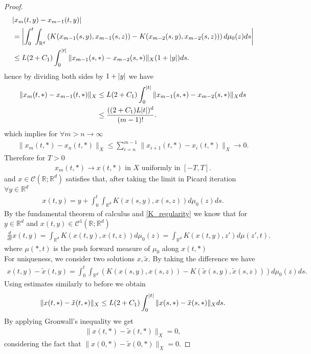 \begin{proof}
  \begin{align*}
    &\abs{x_m(t,y) - x_{m-1}(t,y)} \\
    &= \abs*{\int_0^{t} \int_{\mathbb{R}^{d} }\left( K(x_{m-1}(s,y),x_{m-1}(s,z)) - K(x_{m-2}(s,y),x_{m-2}(s,z)) \right)d\mu_0(z)ds  }\\
    &\le L(2+C_{1})\int_0^{\abs{t}} \|x_{m-1}(s,*)-x_{m-2}(s,*)\|_X(1+\abs{y}) ds
  .\end{align*}
  hence by dividing both sides by $1 + \abs{y}$ we have 
  \begin{align*}
    \|x_m(t,*) - x_{m-1}(t,*)\|_X &\le L(2+C_{1})\int_0^{\abs{t}}  \|x_{m-1}(s,*) - x_{m-2}(s,*)\|_X ds\\
                                  &\le \frac{((2+C_{1})L \abs{t})^{d} }{(m-1)!}
  .\end{align*}
  which implies for $\forall m > n \to \infty$ 
  \begin{align*}
    \|x_m(t,*) - x_n(t,*)\|_X \le  \sum_{i=n}^{m-1} \|x_{i+1}(t,*) - x_i(t,*)\|_X \to  0
  .\end{align*}
  Therefore for $T > 0 $ 
  \begin{align*}
    x_m(t,*) \to x(t,*) \text{ in } X \text{ uniformly in } [-T,T]
  .\end{align*}
  and $x \in  \mathcal{C}(\mathbb{R};\mathbb{R}^{d}  )$ satisfies that, after taking the limit in Picard iteration $\forall y \in  \mathbb{R}^{d} $
  \begin{align*}
    x(t,y) = y + \int_0^{t} \int_{\mathbb{R}^{d} } K(x(s,y),x(s,z)) d\mu_0(z) ds
  .\end{align*}
  By the fundamental theorem of calculus and \autoref{K_regularity} we know that for $y \in  \mathbb{R}^{d} $ and $x(t,y) \in  \mathcal{C}^{1}(\mathbb{R};\mathbb{R}^{d} ) $
  \begin{align*}
    \frac{d}{dt} x(t,y) = \int_{\mathbb{R}^{d} } K(x(t,y),x(t,z)) d\mu_0(z) = \int_{\mathbb{R}^{d} }K(x(t,y),z')d\mu(z',t)
  .\end{align*}
  where $\mu(*,t)$ is the push forward measure of $\mu_0$ along $x(t,*)$\\[1ex]
  For uniqueness, we consider two solutions $x,\tilde{x} $. By taking the difference we have 
  \begin{align*}
    x(t,y) - \tilde{x}(t,y)  = \int_0^{t} \int_{\mathbb{R}^{d} } \left( K(x(s,y),x(s,z)) - K(\tilde{x}(s,y),\tilde{x}(s,z)  )\right)  d\mu_0(z)ds
  .\end{align*}
  Using estimates similarly to before  we obtain 
  \begin{align*}
    \|x(t,*)-\tilde{x}(t,*) \|_X \le L(2+C_{1})\int_0^{\abs{t}} \|x(s,*)-\tilde{x}(s,*) \|_X ds 
  .\end{align*}
  By applying Gronwall's inequality we get 
  \begin{align*}
    \|x(t,*) - \tilde{x}(t,*) \|_X = 0,
\end{align*}
considering the fact that $\|x(0,*) - \tilde{x}(0,*) \|_X = 0$.
\end{proof}
